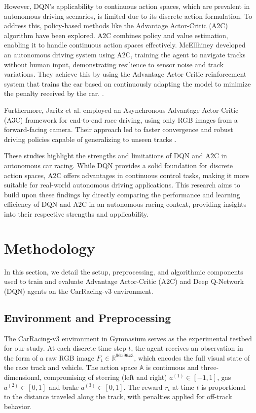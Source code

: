 \documentclass[conference]{IEEEtran}
\begin{document}
However, DQN's applicability to continuous action spaces, which are prevalent in autonomous driving scenarios, is limited due to its discrete action formulation. To address this, policy-based methods like the Advantage Actor-Critic (A2C) algorithm have been explored. A2C combines policy and value estimation, enabling it to handle continuous action spaces effectively. McEllhiney developed an autonomous driving system using A2C, training the agent to navigate tracks without human input, demonstrating resilience to sensor noise and track variations. They achieve this by using the Advantage Actor Critic reinforcement system that trains the car based on continuously adapting the model to minimize the penalty received by the car. \cite{b5}.

Furthermore, Jaritz et al. employed an Asynchronous Advantage Actor-Critic (A3C) framework for end-to-end race driving, using only RGB images from a forward-facing camera. Their approach led to faster convergence and robust driving policies capable of generalizing to unseen tracks \cite{b6}.

These studies highlight the strengths and limitations of DQN and A2C in autonomous car racing. While DQN provides a solid foundation for discrete action spaces, A2C offers advantages in continuous control tasks, making it more suitable for real-world autonomous driving applications. This research aims to build upon these findings by directly comparing the performance and learning efficiency of DQN and A2C in an autonomous racing context, providing insights into their respective strengths and applicability.

\section{Methodology}
In this section, we detail the setup, preprocessing, and algorithmic components used to train and evaluate Advantage Actor-Critic (A2C) and Deep Q-Network (DQN) agents on the CarRacing-v3 environment.

\subsection{Environment and Preprocessing}\label{AA}
The CarRacing-v3 environment in Gymnasium serves as the experimental testbed for our study. At each discrete time step $t$, the agent receives an observation in the form of a raw RGB image $F_t  \in \mathbb{R}^{96x96x3}$, which encodes the full visual state of the race track and vehicle. The action space $\mathbb{A}$ is continuous and three-dimensional, compromising of steering (left and right) $a^{(1)} \in [-1, 1]$, gas $a^{(2)} \in [0, 1]$ and brake $a^{(3)} \in [0, 1]$. The reward $r_t$ at time $t$ is proportional to the distance traveled along the track, with penalties applied for off-track behavior. 
\end{document}

